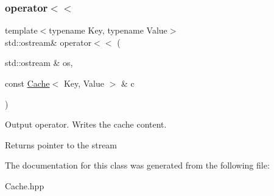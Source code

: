 \subsubsection{\texorpdfstring{operator$<$$<$}{operator<<}}
{\footnotesize\ttfamily template$<$typename Key, typename Value$>$ \\
std\+::ostream\& operator$<$$<$ (\begin{DoxyParamCaption}\item[{std\+::ostream \&}]{os,  }\item[{const \hyperlink{classCache}{Cache}$<$ Key, Value $>$ \&}]{c }\end{DoxyParamCaption})\hspace{0.3cm}{\ttfamily [friend]}}



Output operator. Writes the cache content. 

\begin{DoxyReturn}{Returns}
pointer to the stream 
\end{DoxyReturn}


The documentation for this class was generated from the following file\+:\begin{DoxyCompactItemize}
\item 
Cache.\+hpp\end{DoxyCompactItemize}

